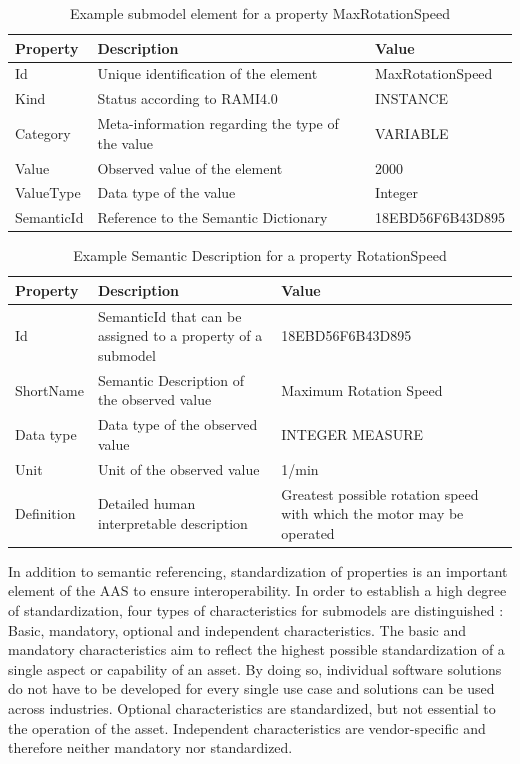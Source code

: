 \begin{table}[ht]
    \centering
    \begin{tabular}{|m{4cm}||m{5cm}||m{5cm}|}
    \hline
        \textbf{Property} & \textbf{Description} & \textbf{Value} \\ \hline
        Id & Unique identification of the element & MaxRotationSpeed  \\ \hline
        Kind & Status according to \ac{RAMI4.0} & INSTANCE  \\ \hline
        Category & Meta-information regarding the type of the value & VARIABLE  \\ \hline
        Value & Observed value of the element & 2000   \\ \hline
        ValueType & Data type of the value & Integer\\ \hline
        SemanticId & Reference to the Semantic Dictionary & 18EBD56F6B43D895 \\ \hline
    \end{tabular}
    \caption{Example submodel element for a property MaxRotationSpeed}
    \label{tab:rotationspeedex}
\end{table}

\begin{table}[ht]
    \centering
    \begin{tabular}{|m{4cm}||m{5cm}||m{5cm}|}
    \hline
        \textbf{Property} & \textbf{Description} & \textbf{Value} \\ \hline
        Id & SemanticId that can be assigned to a property of a submodel & 18EBD56F6B43D895 \\ \hline
        ShortName & Semantic Description of the observed value & Maximum Rotation Speed   \\ \hline
        Data type & Data type of the observed value & INTEGER MEASURE \\ \hline
        Unit & Unit of the observed value & 1/min\\ \hline
        Definition & Detailed human interpretable description & Greatest possible rotation speed with which the motor may be operated \\ \hline
    \end{tabular}
    \caption{Example Semantic Description for a property RotationSpeed}
    \label{tab:rotationspeedex}
\end{table}

In addition to semantic referencing, standardization of properties is an important element of the \ac{AAS} to ensure interoperability. In order to establish a high degree of standardization, four types of characteristics for submodels are distinguished \cite[p. 88]{Heidel2017ReferenzarchitekturmodellIndustrie4.0Komponente}: Basic, mandatory, optional and independent characteristics. The basic and mandatory characteristics aim to reflect the highest possible standardization of a single aspect or capability of an asset. By doing so, individual software solutions do not have to be developed for every single use case and solutions can be used across industries. Optional characteristics are standardized, but not essential to the operation of the asset. Independent characteristics are vendor-specific and therefore neither mandatory nor standardized. 

